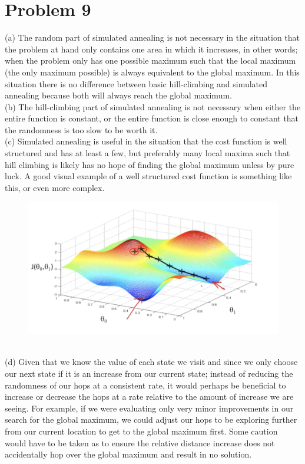 \documentclass[12pt]{article}
\begin{document}
\section *{Problem 9}
(a) The random part of simulated annealing is not necessary in the situation that the problem at hand only contains one area in which it increases, in other words; when the problem only has one possible maximum such that the local maximum (the only maximum possible) is always equivalent to the global maximum. In this situation there is no difference between basic hill-climbing and simulated annealing because both will always reach the global maximum. \\
(b) The hill-climbing part of simulated annealing is not necessary when either the entire function is constant, or the entire function is close enough to constant that the randomness is too slow to be worth it. \\
(c) Simulated annealing is useful in the situation that the cost function is well structured and has at least a few, but preferably many local maxima such that hill climbing is likely has no hope of finding the global maximum unless by pure luck. A good visual example of a well structured cost function is something like this, or even more complex. \\
\begin{figure}[!htb]
	\centering
	\includegraphics[width=.8\textwidth]{costfunction.png}
\end{figure} \\
(d) Given that we know the value of each state we visit and since we only choose our next state if it is an increase from our current state; instead of reducing the randomness of our hops at a consistent rate, it would perhaps be beneficial to increase or decrease the hops at a rate relative to the amount of increase we are seeing. For example, if we were evaluating only very minor improvements in our search for the global maximum, we could adjust our hops to be exploring further from our current location to get to the global maximum first. Some caution would have to be taken as to ensure the relative distance increase does not accidentally hop over the global maximum and result in no solution. \\
\end{document}
